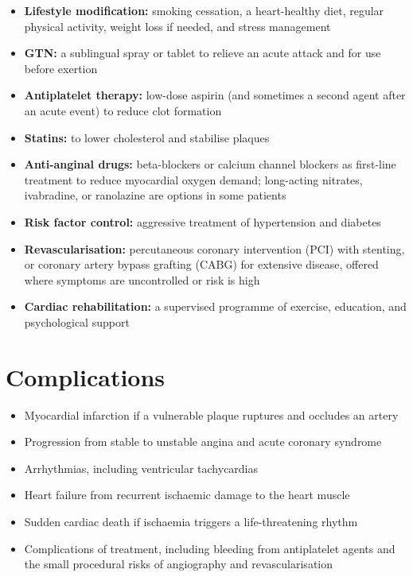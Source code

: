 \begin{itemize}
    \item \textbf{Lifestyle modification:} smoking cessation, a heart-healthy diet, regular physical activity, weight loss if needed, and stress management
    \item \textbf{GTN:} a sublingual spray or tablet to relieve an acute attack and for use before exertion
    \item \textbf{Antiplatelet therapy:} low-dose aspirin (and sometimes a second agent after an acute event) to reduce clot formation
    \item \textbf{Statins:} to lower cholesterol and stabilise plaques
    \item \textbf{Anti-anginal drugs:} beta-blockers or calcium channel blockers as first-line treatment to reduce myocardial oxygen demand; long-acting nitrates, ivabradine, or ranolazine are options in some patients
    \item \textbf{Risk factor control:} aggressive treatment of hypertension and diabetes
    \item \textbf{Revascularisation:} percutaneous coronary intervention (PCI) with stenting, or coronary artery bypass grafting (CABG) for extensive disease, offered where symptoms are uncontrolled or risk is high
    \item \textbf{Cardiac rehabilitation:} a supervised programme of exercise, education, and psychological support
\end{itemize}

\section*{Complications}
\begin{itemize}
    \item Myocardial infarction if a vulnerable plaque ruptures and occludes an artery
    \item Progression from stable to unstable angina and acute coronary syndrome
    \item Arrhythmias, including ventricular tachycardias
    \item Heart failure from recurrent ischaemic damage to the heart muscle
    \item Sudden cardiac death if ischaemia triggers a life-threatening rhythm
    \item Complications of treatment, including bleeding from antiplatelet agents and the small procedural risks of angiography and revascularisation
\end{itemize}

